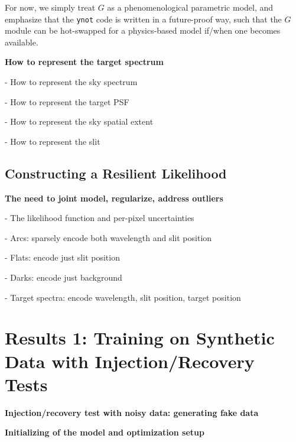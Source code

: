 \documentclass[twocolumn]{aastex63}
\begin{document}
For now, we simply treat $G$ as a phenomenological parametric model, and emphasize that the \texttt{ynot} code is written in a future-proof way, such that the $G$ module can be hot-swapped for a physics-based model if/when one becomes available.




\begin{mdframed}
  \textbf{How to represent the target spectrum} \par
  - How to represent the sky spectrum\par
  - How to represent the target PSF\par
  - How to represent the sky spatial extent\par
  - How to represent the slit\par
\end{mdframed}


\subsection{Constructing a Resilient Likelihood}
\begin{mdframed}
  \textbf{The need to joint model, regularize, address outliers} \par
  - The likelihood function and per-pixel uncertainties\par
  - Arcs: sparsely encode both wavelength and slit position\par
  - Flats: encode just slit position\par
  - Darks: encode just background\par
  - Target spectra: encode wavelength, slit position, target position\par
  \textcolor{lightgray}{\lipsum[7]}
\end{mdframed}


\section{Results 1: Training on Synthetic Data with Injection/Recovery Tests} \label{results1Synthetic}

\begin{mdframed}
  \textbf{Injection/recovery test with noisy data: generating fake data} \par
  \textcolor{lightgray}{\lipsum[9]}
\end{mdframed}

\begin{mdframed}
  \textbf{Initializing of the model and optimization setup} \par
  \textcolor{lightgray}{\lipsum[10]}
\end{mdframed}
\end{document}
